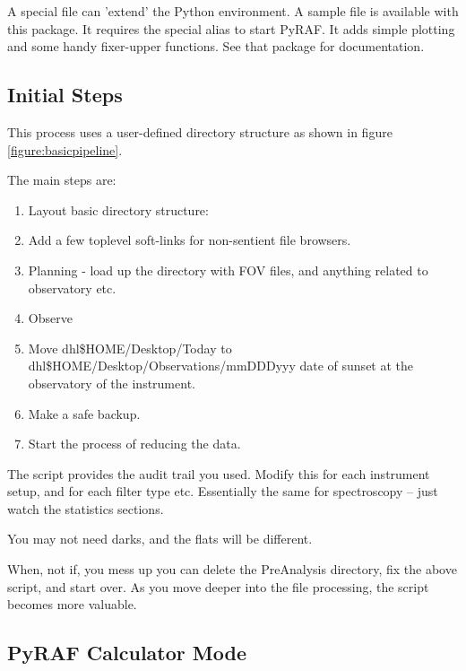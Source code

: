 \documentclass[letter,11pt,oneside]{article}
\newcommand{\dhl}[1]{{\color{verbcolor}{\texttt#1}}}
\begin{document}
A special \dhl{~/iraf/pyraflogin.py} file can 'extend' the Python
environment.  A sample file is available with this package. It
requires the special alias to start PyRAF. It adds simple
\dhl{matplotlib} plotting and some handy fixer-upper functions. See
that package for documentation. 

\subsection{Initial Steps}

This process uses a user-defined  directory structure as shown in
figure \ref{figure:basicpipeline}. 

The main steps are:
\vspace{-.15cm}
\begin{enumerate}\addtolength{\itemsep}{-0.5\baselineskip}
   \item   Layout basic directory structure:


   \item  Add a few toplevel soft-links for non-sentient file browsers.

   \item   Planning - load up the \dhl{\$HOME/Desktop/Today/usw} directory with
FOV files, and anything related to observatory etc.

   \item   Observe
   \item   Move dhl{\$HOME/Desktop/Today} to dhl{\$HOME/Desktop/Observations/mmDDDyyy}
date of sunset at the observatory of the instrument.
   \item   Make a safe backup.
   \item   Start the process of reducing the data.
\end{enumerate}

The script provides the audit trail you used. Modify this for each
instrument setup, and for each filter type etc.  Essentially the same
for spectroscopy -- just watch the statistics sections.

You may not need darks, and the flats will be different.

When, not if, you mess up you can delete the PreAnalysis directory, fix
the above script, and start over. As you move deeper into the file
processing, the script becomes more valuable.


\clearpage
\subsection{PyRAF Calculator Mode}
\end{document}
